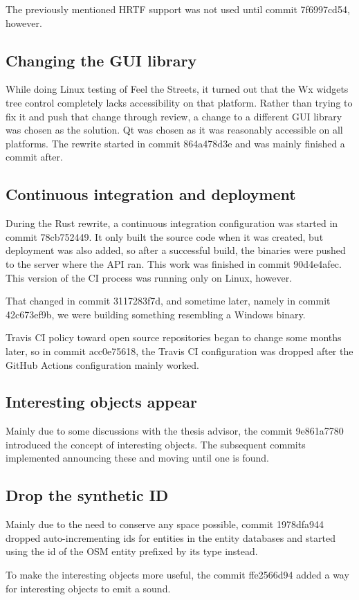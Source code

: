 \documentclass[nolof,digital]{fithesis3}
\begin{document}
The previously mentioned HRTF support was not used until commit 7f6997cd54, however.
\subsection{Changing the GUI library}
While doing Linux testing of Feel the Streets, it turned out that the Wx widgets tree control completely lacks accessibility on that platform. Rather than trying to fix it and push that change through review, a change to a different GUI library was chosen as the solution. Qt was chosen as it was reasonably accessible on all platforms. The rewrite started in commit 864a478d3e and was mainly finished a commit after.
\subsection{Continuous integration and deployment}
During the Rust rewrite, a continuous integration configuration was started in commit 78cb752449. It only built the source code when it was created, but deployment was also added, so after a successful build, the binaries were pushed to the server where the API ran. This work was finished in commit 90d4e4afec. This version of the CI process was running only on Linux, however.

That changed in commit 3117283f7d, and sometime later, namely in commit 42c673ef9b, we were building something resembling a Windows binary.

Travis CI policy toward open source repositories began to change some months later, so in commit acc0e75618, the Travis CI configuration was dropped after the GitHub Actions configuration mainly worked.
\subsection{Interesting objects appear}
Mainly due to some discussions with the thesis advisor, the commit 9e861a7780 introduced the concept of interesting objects. The subsequent commits implemented announcing these and moving until one is found.
\subsection{Drop the synthetic ID}
Mainly due to the need to conserve any space possible, commit 1978dfa944 dropped auto-incrementing ids for entities in the entity databases and started using the id of the OSM entity prefixed by its type instead.

To make the interesting objects more useful, the commit ffe2566d94 added a way for interesting objects to emit a sound.
\end{document}
